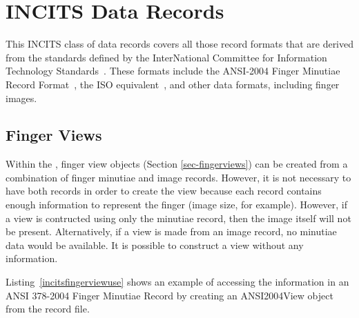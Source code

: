 \section{INCITS Data Records}
\label{sec-incitsdatarecords}

This INCITS class of data records covers all those record formats that are
derived from the standards defined by the InterNational Committee for
Information Technology Standards~\cite{incits}. These formats include the
ANSI-2004 Finger Minutiae Record Format~\cite{std:ansi378-2004}, the ISO
equivalent~\cite{std:iso19794-2}, and other data formats, including finger
images.

\subsection{Finger Views}
\label{sec-incitsfingerviews}
Within the \sname, finger view objects (Section \ref{sec-fingerviews}) can be 
created from a combination of finger minutiae and image records. However, it
is not necessary to have both records in order to create the view because each
record contains enough information to represent the finger (image size, for
example). However, if a view is contructed using only the minutiae record, then
the image itself will not be present. Alternatively, if a view is made from
an image record, no minutiae data would be available. It is possible to
construct a view without any information.

Listing~\ref{incitsfingerviewuse} shows an example of accessing the information
in an ANSI 378-2004 Finger Minutiae Record by creating an ANSI2004View object
from the record file.

